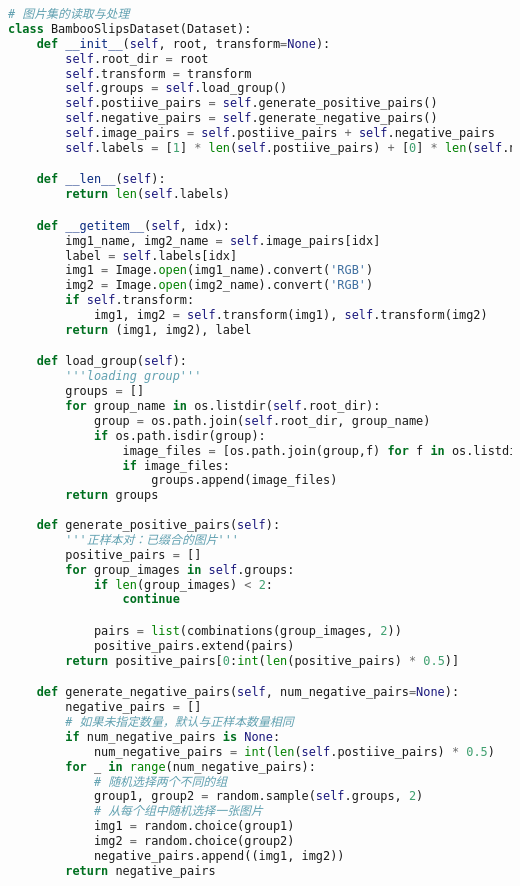 \documentclass{article}
\begin{document}
\begin{lstlisting}[language=Python]
# 图片集的读取与处理
class BambooSlipsDataset(Dataset):
    def __init__(self, root, transform=None):
        self.root_dir = root
        self.transform = transform
        self.groups = self.load_group()
        self.postiive_pairs = self.generate_positive_pairs()
        self.negative_pairs = self.generate_negative_pairs()
        self.image_pairs = self.postiive_pairs + self.negative_pairs
        self.labels = [1] * len(self.postiive_pairs) + [0] * len(self.negative_pairs)

    def __len__(self):
        return len(self.labels)

    def __getitem__(self, idx):
        img1_name, img2_name = self.image_pairs[idx]
        label = self.labels[idx]
        img1 = Image.open(img1_name).convert('RGB')
        img2 = Image.open(img2_name).convert('RGB')
        if self.transform:
            img1, img2 = self.transform(img1), self.transform(img2)
        return (img1, img2), label

    def load_group(self):
        '''loading group'''
        groups = []
        for group_name in os.listdir(self.root_dir):
            group = os.path.join(self.root_dir, group_name)
            if os.path.isdir(group):
                image_files = [os.path.join(group,f) for f in os.listdir(group) if f.endswith(('.png', '.jpg', 'jpeg'))]
                if image_files:
                    groups.append(image_files)
        return groups
    
    def generate_positive_pairs(self):
        '''正样本对：已缀合的图片'''
        positive_pairs = []
        for group_images in self.groups:
            if len(group_images) < 2:
                continue

            pairs = list(combinations(group_images, 2))
            positive_pairs.extend(pairs)
        return positive_pairs[0:int(len(positive_pairs) * 0.5)]

    def generate_negative_pairs(self, num_negative_pairs=None):
        negative_pairs = []
        # 如果未指定数量，默认与正样本数量相同
        if num_negative_pairs is None:
            num_negative_pairs = int(len(self.postiive_pairs) * 0.5)
        for _ in range(num_negative_pairs):
            # 随机选择两个不同的组
            group1, group2 = random.sample(self.groups, 2)
            # 从每个组中随机选择一张图片
            img1 = random.choice(group1)
            img2 = random.choice(group2)
            negative_pairs.append((img1, img2))
        return negative_pairs
\end{lstlisting}
\end{document}
